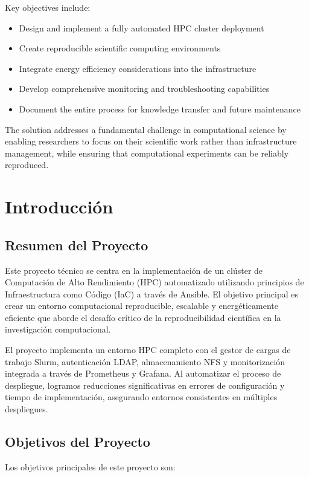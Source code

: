 \documentclass[12pt,a4paper]{report}
\begin{document}
Key objectives include:
\begin{itemize}
    \item Design and implement a fully automated HPC cluster deployment
    \item Create reproducible scientific computing environments
    \item Integrate energy efficiency considerations into the infrastructure
    \item Develop comprehensive monitoring and troubleshooting capabilities
    \item Document the entire process for knowledge transfer and future maintenance
\end{itemize}

The solution addresses a fundamental challenge in computational science by enabling researchers to focus on their scientific work rather than infrastructure management, while ensuring that computational experiments can be reliably reproduced.

\chapter{Introducción}

\section{Resumen del Proyecto}

Este proyecto técnico se centra en la implementación de un clúster de Computación de Alto Rendimiento (HPC) automatizado utilizando principios de Infraestructura como Código (IaC) a través de Ansible. El objetivo principal es crear un entorno computacional reproducible, escalable y energéticamente eficiente que aborde el desafío crítico de la reproducibilidad científica en la investigación computacional.

El proyecto implementa un entorno HPC completo con el gestor de cargas de trabajo Slurm, autenticación LDAP, almacenamiento NFS y monitorización integrada a través de Prometheus y Grafana. Al automatizar el proceso de despliegue, logramos reducciones significativas en errores de configuración y tiempo de implementación, asegurando entornos consistentes en múltiples despliegues.

\section{Objetivos del Proyecto}

Los objetivos principales de este proyecto son:
\end{document}
